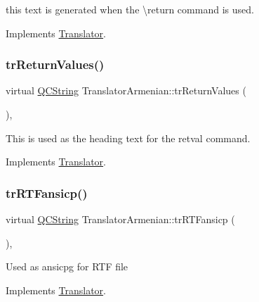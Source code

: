 this text is generated when the \textbackslash{}return command is used. 

Implements \mbox{\hyperlink{class_translator}{Translator}}.

\mbox{\label{class_translator_armenian_ab445369352bb361f4884d24f1476631a}} 
\subsubsection{\texorpdfstring{trReturnValues()}{trReturnValues()}}
{\footnotesize\ttfamily virtual \mbox{\hyperlink{class_q_c_string}{Q\+C\+String}} Translator\+Armenian\+::tr\+Return\+Values (\begin{DoxyParamCaption}{ }\end{DoxyParamCaption})\hspace{0.3cm}{\ttfamily [inline]}, {\ttfamily [virtual]}}

This is used as the heading text for the retval command. 

Implements \mbox{\hyperlink{class_translator}{Translator}}.

\mbox{\label{class_translator_armenian_ae1bc9124d188c8a6b6c0fafdadf51da1}} 
\subsubsection{\texorpdfstring{trRTFansicp()}{trRTFansicp()}}
{\footnotesize\ttfamily virtual \mbox{\hyperlink{class_q_c_string}{Q\+C\+String}} Translator\+Armenian\+::tr\+R\+T\+Fansicp (\begin{DoxyParamCaption}{ }\end{DoxyParamCaption})\hspace{0.3cm}{\ttfamily [inline]}, {\ttfamily [virtual]}}

Used as ansicpg for R\+TF file 

Implements \mbox{\hyperlink{class_translator_a9953a4c0e6a4fc7d017abcd5c2939e0f}{Translator}}.

\mbox{\label{class_translator_armenian_ad22ecd1b8a7b28d49ef44ffec09f555e}} 
